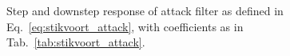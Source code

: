 \documentclass[../main2.tex]{subfiles}
\providecommand{\rootdir}{..}
\begin{document}
\begin{figure}
\centerline{}
\caption{Step and downstep response of attack filter as defined in Eq.~\eqref{eq:stikvoort_attack}, with coefficients as in Tab.~\ref{tab:stikvoort_attack}.}
\label{fig:step_stikvoort_attack}
\end{figure}
\end{document}
